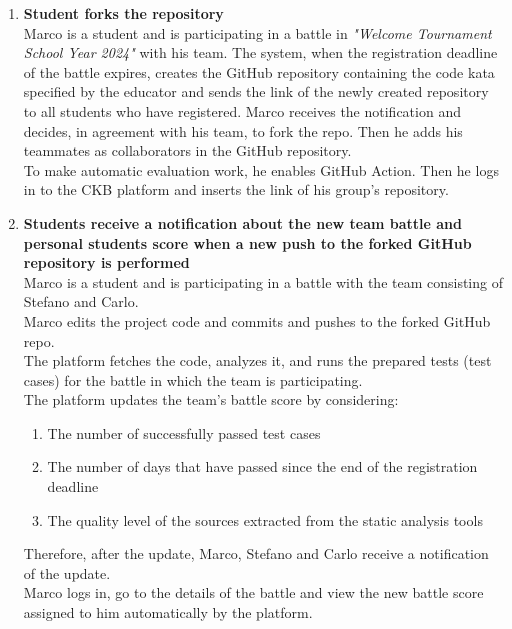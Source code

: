 \begin{enumerate}
	\item \textbf{Student forks the repository}\\
	      Marco is a student and is participating in a battle in \emph{"Welcome Tournament School Year 2024"} with his team.
	      The system, when the registration deadline of the battle expires, creates the GitHub repository containing the code kata specified by the educator and sends the link of the newly created repository to all students who have registered.
	      Marco receives the notification and decides, in agreement with his team, to fork the repo.
	      Then he adds his teammates as collaborators in the GitHub repository.\\
	      To make automatic evaluation work, he enables GitHub Action.
	      Then he logs in to the CKB platform and inserts the link of his group's repository.

	\item \textbf{Students receive a notification about the new team battle and personal students score when a new push to the forked GitHub repository is performed}\\
	      Marco is a student and is participating in a battle with the team consisting of Stefano and Carlo.\\
	      Marco edits the project code and commits and pushes to the forked GitHub repo.\\
	      The platform fetches the code, analyzes it, and runs the prepared tests (test cases) for the battle in which the team is participating.\\
	      The platform updates the team's battle score by considering:
	      \begin{enumerate}
		      \item The number of successfully passed test cases
		      \item The number of days that have passed since the end of the registration deadline
		      \item The quality level of the sources extracted from the static analysis tools
	      \end{enumerate}
	      Therefore, after the update, Marco, Stefano and Carlo receive a notification of the update.\\
	      Marco logs in, go to the details of the battle and view the new battle score assigned to him automatically by the platform.


\end{enumerate}
